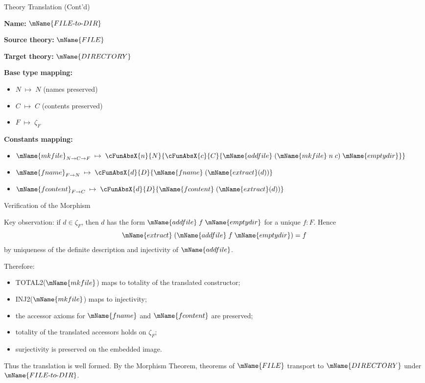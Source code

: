 \documentclass[aspectratio=169]{beamer}
\newcommand{\FILETYPE}{\mName{FILE}}
\newcommand{\DIR}{\mName{DIRECTORY}}
\newcommand{\mkfile}{\mName{mkfile}}
\newcommand{\fname}{\mName{fname}}
\newcommand{\fcontent}{\mName{fcontent}}
\begin{document}
\begin{frame}[fragile]{Theory Translation (Cont'd)}
\small

\textbf{Name:} $\mName{FILE\text{-}to\text{-}DIR}$

\textbf{Source theory:} $\FILETYPE$

\textbf{Target theory:} $\DIR$

\textbf{Base type mapping:}
\begin{itemize}
  \item[] $N \;\mapsto\; N$ \quad (names preserved)
  \item[] $C \;\mapsto\; C$ \quad (contents preserved)
  \item[] $F \;\mapsto\; \zeta_F$
\end{itemize}

\textbf{Constants mapping:}
\begin{itemize}
  \item[] $\mkfile_{N \to C \to F} \;\mapsto\;
    \cFunAbsX{n}{N}{\cFunAbsX{c}{C}{
      \mName{addfile}\;(\mkfile\;n\;c)\;\mName{emptydir}}}$
  \item[] $\fname_{F \to N} \;\mapsto\;
    \cFunAbsX{d}{D}{\fname\;(\mName{extract}(d))}$
  \item[] $\fcontent_{F \to C} \;\mapsto\;
    \cFunAbsX{d}{D}{\fcontent\;(\mName{extract}(d))}$
\end{itemize}

\end{frame}

\begin{frame}{Verification of the Morphism}
\small

Key observation: if $d \in \zeta_F$, then $d$ has the form
$\mName{addfile}\;f\;\mName{emptydir}$ for a unique $f : F$.
Hence
\[
\mName{extract}\;(\mName{addfile}\;f\;\mName{emptydir}) = f
\]
by uniqueness of the definite description and injectivity of
$\mName{addfile}$.

\medskip
Therefore:
\begin{itemize}
  \item TOTAL2($\mkfile$) maps to totality of the translated constructor;
  \item INJ2($\mkfile$) maps to injectivity;
  \item the accessor axioms for $\fname$ and $\fcontent$ are preserved;
  \item totality of the translated accessors holds on $\zeta_F$;
  \item surjectivity is preserved on the embedded image.
\end{itemize}

\medskip
Thus the translation is well formed. By the Morphism Theorem,
theorems of $\FILETYPE$ transport to $\DIR$ under
$\mName{FILE\text{-}to\text{-}DIR}$.
\end{frame}
\end{document}
